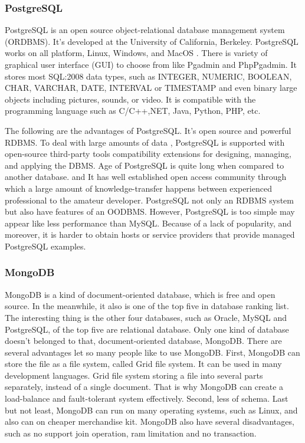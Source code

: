 \subsubsection{PostgreSQL}

PostgreSQL is an open source object-relational database management system (ORDBMS).
It's developed at the University of California, Berkeley.
PostgreSQL works on all platform, Linux, Windows, and MacOS .
There is variety of graphical user interface (GUI)  to choose from like Pgadmin and PhpPgadmin.
It stores most SQL:2008 data types, such as INTEGER, NUMERIC, BOOLEAN, CHAR, VARCHAR, DATE, INTERVAL or TIMESTAMP and even binary large objects including pictures, sounds, or video.
It is compatible with the  programming language such as C/C++,NET, Java, Python, PHP, etc.

The following are the  advantages of PostgreSQL.
It's open source  and powerful RDBMS.
To deal with large amounts of data , PostgreSQL 
is supported with  open-source third-party tools compatibility extensions for designing, managing, and applying the DBMS.
Age of PostgreSQL is quite long when compared to
another database. and It has well established  open access  community through which a large amount of  knowledge-transfer happens between experienced professional to the amateur developer. 
PostgreSQL not only  an RDBMS system but also have 
features of an OODBMS.
However, PostgreSQL is too simple may appear like less 
performance than MySQL.
Because of a lack of popularity, and moreover, it is harder to obtain hosts or service providers that provide managed PostgreSQL examples.


\subsubsection{MongoDB}
MongoDB is a kind of document-oriented database, which is free and open source. 
In the meanwhile, it also is one of the top five in database ranking list. 
The interesting thing is the other four databases, such as Oracle, MySQL and PostgreSQL, of the top five are relational database.
Only one kind of database doesn't belonged to that, document-oriented database, MongoDB.
There are several advantages let so many people like to use MongoDB.
First, MongoDB can store the file as a file system, called Grid file system.
It can be used in many development languages.
Grid file system storing a file into several parts separately, instead of a single document.
That is why MongoDB can create a load-balance and fault-tolerant system effectively.
Second, less of schema. 
Last but not least, MongoDB can run on many operating systems, such as Linux, and also can on cheaper merchandise kit.
MongoDB also have several disadvantages, such as no support join operation, ram limitation and no transaction.


